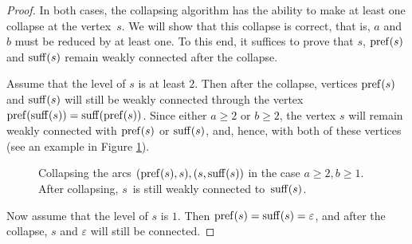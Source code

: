 \begin{proof}
In both cases, the collapsing algorithm has the ability to make at least one collapse at the vertex~$ s $. We will show that this collapse is correct, that is, $ a $ and $ b $ must be reduced by at least one. To this end, it suffices to prove that $ s $, $ \operatorname{pref} (s) $ and $ \operatorname{suff} (s) $ remain weakly connected after the collapse.

Assume that the level of $ s $ is at least $ 2 $. Then after the collapse, vertices $ \operatorname{pref}(s) $ and $ \operatorname{suff} (s) $ will still be weakly connected through the vertex $ \operatorname{pref} (\operatorname{suff} (s)) = \operatorname{suff} (\operatorname{pref} (s)) $. Since either $ a \ge 2 $ or $ b \ge 2 $, the vertex $ s $ will remain weakly connected with $ \operatorname{pref} (s) $ or $ \operatorname{suff} (s) $, and, hence, with both of these vertices (see an example in Figure \ref{fig:collapsea2b1}).

\begin{figure}[ht]
\begin{center}

\end{center}
    
\caption{Collapsing the arcs $(\operatorname{pref}(s), s), (s, \operatorname{suff}(s))$ in the case $a \ge 2, b \ge 1$. After collapsing, $s$~is still weakly connected to~$\operatorname{suff}(s)$.}\label{fig:collapsea2b1}
\end{figure}

Now assume that the level of $s$ is $1$. Then $ \operatorname{pref} (s) = \operatorname{suff} (s) = \varepsilon $, and after the collapse, $s$ and $ \varepsilon $ will still be connected.
\end{proof}

